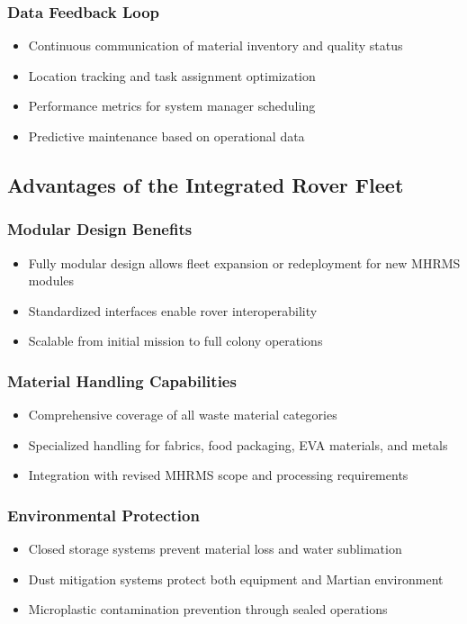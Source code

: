 \documentclass[12pt, a4paper]{article}
\begin{document}
\subsubsection{Data Feedback Loop}
\begin{itemize}
    \item Continuous communication of material inventory and quality status
    \item Location tracking and task assignment optimization
    \item Performance metrics for system manager scheduling
    \item Predictive maintenance based on operational data
\end{itemize}

\subsection{Advantages of the Integrated Rover Fleet}

\subsubsection{Modular Design Benefits}
\begin{itemize}
    \item Fully modular design allows fleet expansion or redeployment for new MHRMS modules
    \item Standardized interfaces enable rover interoperability
    \item Scalable from initial mission to full colony operations
\end{itemize}

\subsubsection{Material Handling Capabilities}
\begin{itemize}
    \item Comprehensive coverage of all waste material categories
    \item Specialized handling for fabrics, food packaging, EVA materials, and metals
    \item Integration with revised MHRMS scope and processing requirements
\end{itemize}

\subsubsection{Environmental Protection}
\begin{itemize}
    \item Closed storage systems prevent material loss and water sublimation
    \item Dust mitigation systems protect both equipment and Martian environment
    \item Microplastic contamination prevention through sealed operations
\end{itemize}
\end{document}
